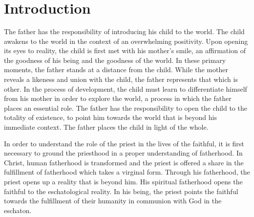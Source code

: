 \documentclass[twoside,10pt]{article}
\begin{document}
\begin{center}
	\vspace*{20mm}
        {\huge {}}\\
	\vspace{5mm}
	{\Large {}}\\
	\vspace*{\fill}
        {\large {}}\\
	\vspace{2mm}
	{\large {}}\\
	\vspace{2mm}
	{\large {}}\\
	\vspace{2mm}
	{\large {}}
\end{center}

\thispagestyle{empty}
\newpage



\section{Introduction}

The father has the responsibility of introducing his child to the world. The child awakens to the world in the context of an overwhelming positivity. Upon opening its eyes to reality, the child is first met with his mother’s smile, an affirmation of the goodness of his being and the goodness of the world. In these primary moments, the father stands at a distance from the child. While the mother reveals a likeness and union with the child, the father represents that which is other. In the process of development, the child must learn to differentiate himself from his mother in order to explore the world, a process in which the father places an essential role. The father has the responsibility to open the child to the totality of existence, to point him towards the world that is beyond his immediate context. The father places the child in light of the whole. 

In order to understand the role of the priest in the lives of the faithful, it is first necessary to ground the priesthood in a proper understanding of fatherhood. In Christ, human fatherhood is transformed and the priest is offered a share in the fulfillment of fatherhood which takes a virginal form. Through his fatherhood, the priest opens up a reality that is beyond him. His spiritual fatherhood opens the faithful to the eschatological reality. In his being, the priest points the faithful towards the fulfillment of their humanity in communion with God in the eschaton. 
\end{document}

